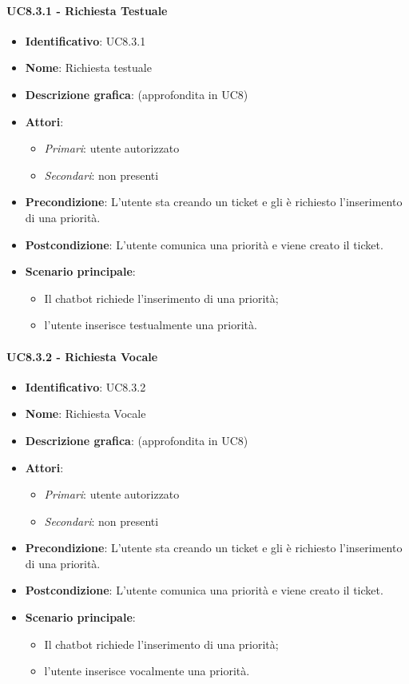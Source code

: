 \paragraph{UC8.3.1 - Richiesta Testuale}
\begin{itemize}
   \item \textbf{Identificativo}: UC8.3.1
   \item \textbf{Nome}: Richiesta testuale
   \item \textbf{Descrizione grafica}: (approfondita in UC8)
   \item \textbf{Attori}:
   \begin{itemize} 
       \item \textit{Primari}: utente autorizzato
       \item \textit{Secondari}: non presenti
   \end{itemize}
       \item \textbf{Precondizione}: L'utente sta creando un ticket e gli è richiesto l'inserimento di una priorità.
       \item \textbf{Postcondizione}: L'utente comunica una priorità e viene creato il ticket. 
    \item \textbf{Scenario principale}: 
       \begin{itemize}
           \item Il chatbot richiede l'inserimento di una priorità;
           \item l'utente inserisce testualmente una priorità.
       \end{itemize}
\end{itemize}

\paragraph{UC8.3.2 - Richiesta Vocale}
\begin{itemize}
   \item \textbf{Identificativo}: UC8.3.2
   \item \textbf{Nome}: Richiesta Vocale
   \item \textbf{Descrizione grafica}: (approfondita in UC8)
   \item \textbf{Attori}:
   \begin{itemize} 
       \item \textit{Primari}: utente autorizzato
       \item \textit{Secondari}: non presenti
   \end{itemize}
   \item \textbf{Precondizione}: L'utente sta creando un ticket e gli è richiesto l'inserimento di una priorità.
   \item \textbf{Postcondizione}: L'utente comunica una priorità e viene creato il ticket. 
    \item \textbf{Scenario principale}: 
       \begin{itemize}  
        \item Il chatbot richiede l'inserimento di una priorità;
        \item l'utente inserisce vocalmente una priorità.
       \end{itemize}
\end{itemize}


